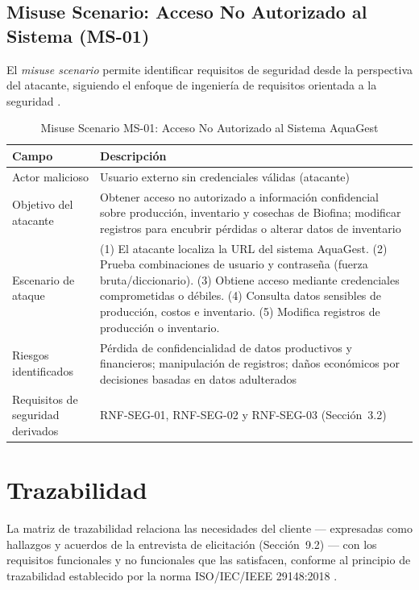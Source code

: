 \documentclass[12pt,a4paper]{article}
\begin{document}
\subsection{Misuse Scenario: Acceso No Autorizado al Sistema (MS-01)}

El \textit{misuse scenario} permite identificar requisitos de seguridad desde
la perspectiva del atacante, siguiendo el enfoque de ingeniería de requisitos
orientada a la seguridad \cite{Pohl2010,SWEBOK2024}.

\begin{table}[H]
\centering
\caption{Misuse Scenario MS-01: Acceso No Autorizado al Sistema AquaGest}
\begin{tabular}{|p{3.8cm}|p{10.4cm}|}
\hline
\textbf{Campo} & \textbf{Descripción} \\
\hline
Actor malicioso & Usuario externo sin credenciales válidas (atacante) \\ \hline
Objetivo del atacante & Obtener acceso no autorizado a información
confidencial sobre producción, inventario y cosechas de Biofina; modificar
registros para encubrir pérdidas o alterar datos de inventario \\ \hline
Escenario de ataque & (1) El atacante localiza la URL del sistema AquaGest.
(2) Prueba combinaciones de usuario y contraseña (fuerza bruta/diccionario).
(3) Obtiene acceso mediante credenciales comprometidas o débiles.
(4) Consulta datos sensibles de producción, costos e inventario.
(5) Modifica registros de producción o inventario. \\ \hline
Riesgos identificados & Pérdida de confidencialidad de datos productivos y
financieros; manipulación de registros; daños económicos por decisiones
basadas en datos adulterados \\ \hline
Requisitos de seguridad derivados & RNF-SEG-01, RNF-SEG-02 y RNF-SEG-03
(Sección~3.2) \\ \hline
\end{tabular}
\end{table}

\section{Trazabilidad}

La matriz de trazabilidad relaciona las necesidades del cliente --- expresadas
como hallazgos y acuerdos de la entrevista de elicitación (Sección~9.2) --- con
los requisitos funcionales y no funcionales que las satisfacen, conforme al
principio de trazabilidad establecido por la norma ISO/IEC/IEEE 29148:2018
\cite{ISO29148:2018,Pohl2010}.
\end{document}
